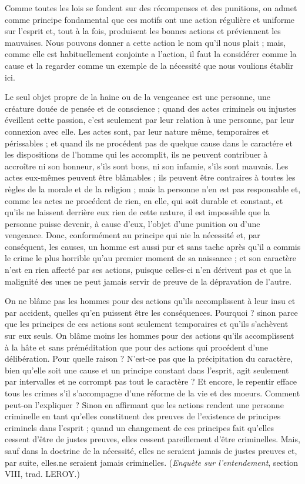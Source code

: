 Comme toutes les lois se fondent sur des récompenses
et des punitions, on admet comme principe fondamental
que ces motifs ont une action régulière et uniforme sur
l'esprit et, tout à la fois, produisent les bonnes actions et
préviennent les mauvaises. Nous pouvons donner a cette
action le nom qu’il nous plait ; mais, comme elle est habituellement
conjointe a l’action, il faut la considérer comme
la cause et la regarder comme un exemple de la nécessité
que nous voulions établir ici.

Le seul objet propre de la haine ou de la vengeance est
une personne, une créature douée de pensée et de conscience ;
quand des actes criminels ou injustes éveillent
cette passion, c’est seulement par leur relation à une
personne, par leur connexion avec elle. Les actes sont,
par leur nature même, temporaires et périssables ; et
quand ils ne procédent pas de quelque cause dans le
caractére et les dispositions de l'homme qui les accomplit,
ils ne peuvent contribuer à accroître ni son honneur,
s’ils sont bons, ni son infamie, s’ils sont mauvais. Les
actes eux-mêmes peuvent être blâmables ; ils peuvent être
contraires à toutes les règles de la morale et de la religion ;
mais la personne n’en est pas responsable et, comme les
actes ne procédent de rien, en elle, qui soit durable et
constant, et qu’ils ne laissent derrière eux rien de cette
nature, il est impossible que la personne puisse devenir,
à cause d’eux, l’objet d’une punition ou d’une vengeance.
Donc, conformément au principe qui nie la nécessité et,
par conséquent, les causes, un homme est aussi pur et
sans tache après qu’il a commis le crime le plus horrible
qu’au premier moment de sa naissance ; et son caractère
n’est en rien affecté par ses actions, puisque celles-ci n’en
dérivent pas et que la malignité des unes ne peut jamais
servir de preuve de la dépravation de l’autre.

On ne blâme pas les hommes pour des actions qu’ils
accomplissent à leur insu et par accident, quelles qu’en
puissent être les conséquences. Pourquoi ? sinon parce
que les principes de ces actions sont seulement temporaires
et qu'ils s’achèvent sur eux seuls. On blâme moins
les hommes pour des actions qu’ils accomplissent à la
hâte et sans préméditation que pour des actions qui
procédent d’une délibération. Pour quelle raison ? N’est-ce
pas que la précipitation du caractère, bien qu’elle soit une
cause et un principe constant dans l’esprit, agit seulement
par intervalles et ne corrompt pas tout le caractère ?
Et encore, le repentir efface tous les crimes s’il s’accompagne
d’une réforme de la vie et des moeurs. Comment peut-on
l'expliquer ? Sinon en affirmant que les actions rendent
une personne criminelle en tant qu’elles constituent des
preuves de l’existence de principes criminels dans l’esprit ;
quand un changement de ces principes fait qu’elles cessent
d’être de justes preuves, elles cessent pareillement d’être
criminelles. Mais, sauf dans la doctrine de la nécessité,
elles ne seraient jamais de justes preuves et, par suite,
elles.ne seraient jamais criminelles. ({\it Enquète sur l’entendement},
section VIII, trad. L{\footnotesize EROY}.)

